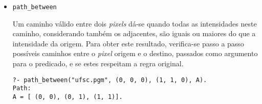\documentclass{../sftex/sftex}
\begin{document}
\begin{itemize}
\item \verb!path_between!

Um caminho válido entre dois \emph{pixels} dá-se quando todas as intensidades
neste caminho, considerando também os adjacentes, são iguais ou maiores do que
a intensidade da origem. Para obter este resultado, verifica-se passo a passo
possíveis caminhos entre o \emph{pixel} origem e o destino, passados como
argumento para o predicado, e se estes respeitam a regra original.
\begin{verbatim}
?- path_between("ufsc.pgm", (0, 0, 0), (1, 1, 0), A).
Path:
A = [ (0, 0), (0, 1), (1, 1)].
\end{verbatim}

\end{itemize}
\end{document}
